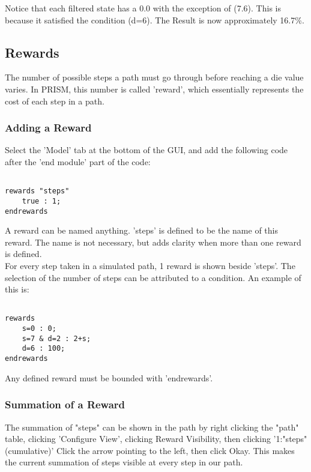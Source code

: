 \documentclass[a4paper]{article}
\begin{document}
Notice that each filtered state has a 0.0 with the exception of (7.6). This is because it satisfied the condition (d=6). The Result is now approximately 16.7\%.

\subsection{Rewards}
The number of possible steps a path must go through before reaching a die value varies. In PRISM, this number is called 'reward', which essentially represents the cost of each step in a path. 


\subsubsection{Adding a Reward}
Select the 'Model' tab at the bottom of the GUI, and add the following code after the 'end module' part of the code:


\begin{lstlisting}

rewards "steps"
	true : 1;
endrewards

\end{lstlisting}

A reward can be named anything. 'steps' is defined to be the name of this reward. The name is not necessary, but adds clarity when more than one reward is defined.
\\[1\baselineskip]
For every step taken in a simulated path, 1 reward is shown beside 'steps'. The selection of the number of steps can be attributed to a condition. An example of this is:

\begin{lstlisting}

rewards
    s=0 : 0;
    s=7 & d=2 : 2+s;
    d=6 : 100;
endrewards

\end{lstlisting}

Any defined reward must be bounded with 'endrewards'.

\subsubsection{Summation of a Reward}

The summation of "steps" can be shown in the path by 
right clicking the "path" table, clicking 'Configure View', clicking Reward Visibility, then clicking 
\newline
'1:"steps" (cumulative)'
\newline
Click the arrow pointing to the left, then click Okay. This makes the current summation of steps visible at every step in our path.
\end{document}
